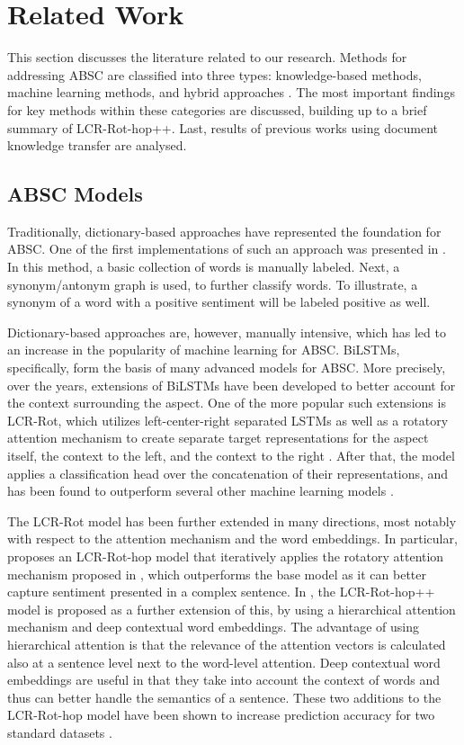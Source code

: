 \documentclass[runningheads]{llncs}
\begin{document}
\section{Related Work}
\label{sec:literature}
This section discusses the literature related to our research. Methods for addressing ABSC are classified into three types: knowledge-based methods, machine learning methods, and hybrid approaches \cite{brauwers2021}. The most important findings for key methods within these categories are discussed, building up to a brief summary of LCR-Rot-hop++. Last, results of previous works using document knowledge transfer are analysed.

\subsection{ABSC Models}

Traditionally, dictionary-based approaches have represented the foundation for ABSC. One of the first implementations of such an approach was presented in \cite{Hu2004}. In this method, a basic collection of words is manually labeled. Next, a synonym/antonym graph is used, to further classify words. To illustrate, a synonym of a word with a positive sentiment will be labeled positive as well.

Dictionary-based approaches are, however, manually intensive, which has led to an increase in the popularity of machine learning for ABSC. BiLSTMs, specifically, form the basis of many advanced models for ABSC. More precisely, over the years, extensions of BiLSTMs have been developed to better account for the context surrounding the aspect. One of the more popular such extensions is LCR-Rot, which utilizes left-center-right separated LSTMs as well as a rotatory attention mechanism to create separate target representations for the aspect itself, the context to the left, and the context to the right \cite{Zheng2018}. After that, the model applies a classification head over the concatenation of their representations, and has been found to outperform several other machine learning models \cite{Zheng2018}. 

The LCR-Rot model has been further extended in many directions, most notably with respect to the attention mechanism and the word embeddings. In particular, \cite{Wallaart2019} proposes an LCR-Rot-hop model that iteratively applies the rotatory attention mechanism proposed in \cite{Zheng2018}, which outperforms the base model as it can better capture sentiment presented in a complex sentence. In \cite{Trusca2020}, the LCR-Rot-hop++ model is proposed as a further extension of this, by using a hierarchical attention mechanism and deep contextual word embeddings. The advantage of using hierarchical attention is that the relevance of the attention vectors is calculated also at a sentence level next to the word-level attention. Deep contextual word embeddings are useful in that they take into account the context of words and thus can better handle the semantics of a sentence. These two additions to the LCR-Rot-hop model have been shown to increase prediction accuracy for two standard datasets \cite{SemEval2015, SemEval2016}. 
\end{document}
